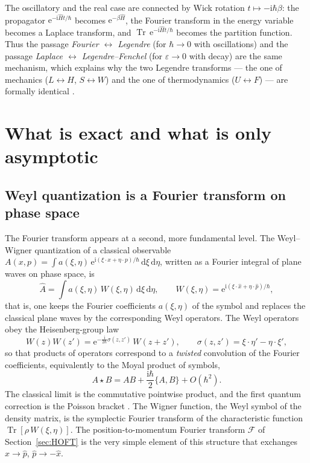 \documentclass[11pt,a4paper]{article}
\newcommand{\ii}{\mathrm{i}}
\newcommand{\dd}{\mathrm{d}}
\newcommand{\ee}{\mathrm{e}}
\newcommand{\hb}{\hbar}
\newcommand{\op}[1]{\hat{#1}}
\newcommand{\Pois}[2]{\{#1,#2\}}
\newcommand{\FT}{\mathcal{F}}
\theoremstyle{plain}
\theoremstyle{definition}
\theoremstyle{remark}
\begin{document}
The oscillatory and the real case are connected by Wick rotation $t\mapsto-\ii\hb\beta$: the propagator $\ee^{-\ii\op Ht/\hb}$ becomes $\ee^{-\beta\op H}$, the Fourier transform in the energy variable becomes a Laplace transform, and $\operatorname{Tr}\,\ee^{-\ii\op Ht/\hb}$ becomes the partition function. Thus the passage \emph{Fourier $\leftrightarrow$ Legendre} (for $\hb\to0$ with oscillations) and the passage \emph{Laplace $\leftrightarrow$ Legendre--Fenchel} (for $\varepsilon\to0$ with decay) are the same mechanism, which explains why the two Legendre transforms --- the one of mechanics ($L\leftrightarrow H$, $S\leftrightarrow W$) and the one of thermodynamics ($U\leftrightarrow F$) --- are formally identical \cite{Zia}.

\section{What is exact and what is only asymptotic}\label{sec:exact}

\subsection{Weyl quantization is a Fourier transform on phase space}

The Fourier transform appears at a second, more fundamental level. The Weyl--Wigner quantization \cite{Weyl,Wigner,Groenewold,Moyal} of a classical observable $A(x,p)=\int a(\xi,\eta)\,\ee^{\ii(\xi\cdot x+\eta\cdot p)/\hb}\,\dd\xi\,\dd\eta$, written as a Fourier integral of plane waves on phase space, is
\begin{equation}
\op A=\int a(\xi,\eta)\,W(\xi,\eta)\,\dd\xi\,\dd\eta,\qquad W(\xi,\eta)=\ee^{\ii(\xi\cdot\op x+\eta\cdot\op p)/\hb},
\end{equation}
that is, one keeps the Fourier coefficients $a(\xi,\eta)$ of the symbol and replaces the classical plane waves by the corresponding Weyl operators. The Weyl operators obey the Heisenberg-group law
\begin{equation}
W(z)W(z')=\ee^{-\frac{\ii}{2\hb}\sigma(z,z')}\,W(z+z'),\qquad \sigma(z,z')=\xi\cdot\eta'-\eta\cdot\xi',
\end{equation}
so that products of operators correspond to a \emph{twisted} convolution of the Fourier coefficients, equivalently to the Moyal product of symbols,
\begin{equation}
A\star B=AB+\frac{\ii\hb}{2}\Pois AB+O(\hb^2).
\end{equation}
The classical limit is the commutative pointwise product, and the first quantum correction is the Poisson bracket \cite{Groenewold,Moyal,Folland,Hall,Howe}. The Wigner function, the Weyl symbol of the density matrix, is the symplectic Fourier transform of the characteristic function $\operatorname{Tr}[\rho\,W(\xi,\eta)]$. The position-to-momentum Fourier transform $\FT$ of Section~\ref{sec:HOFT} is the very simple element of this structure that exchanges $\op x\to\op p$, $\op p\to-\op x$.
\end{document}
